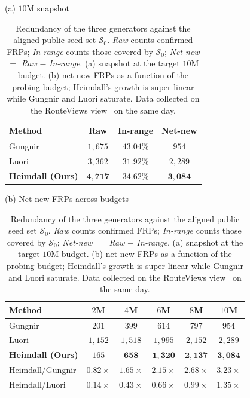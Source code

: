 \documentclass[conference]{IEEEtran}
\begin{document}
\begin{table}[t]
\centering
\caption{Redundancy of the three generators against the aligned
public seed set $\mathcal{S}_{0}$.  \emph{Raw} counts confirmed
FRPs; \emph{In-range} counts those covered by $\mathcal{S}_{0}$;
\emph{Net-new} $=$ \emph{Raw} $-$ \emph{In-range}.  (a) snapshot
at the target $10$M budget.  (b) net-new FRPs as a function of
the probing budget; Heimdall's growth is super-linear while Gungnir
and Luori saturate.  Data collected on the RouteViews
view~\cite{routeviews} on the same day.}
\label{tab:redundancy}
\vspace{2pt}
\small
\begin{minipage}{0.44\linewidth}
\centering
(a) $10$M snapshot\\[2pt]
\begin{tabular}{lccc}
\toprule
Method & Raw & In-range & \textbf{Net-new}\\
\midrule
Gungnir~\cite{wei2025gungnir} & $1{,}675$ & $43.04\%$ & $954$\\
Luori~\cite{cheng2024luori}   & $3{,}362$ & $31.92\%$ & $2{,}289$\\
\textbf{Heimdall (Ours)}          & $\mathbf{4{,}717}$ & $\mathbf{34.62\%}$ & $\mathbf{3{,}084}$\\
\bottomrule
\end{tabular}
\end{minipage}
\hfill
\begin{minipage}{0.54\linewidth}
\centering
(b) Net-new FRPs across budgets\\[2pt]
\begin{tabular}{lccccc}
\toprule
Method & $2$M & $4$M & $6$M & $8$M & $10$M\\
\midrule
Gungnir & $201$ & $399$ & $614$ & $797$ & $954$\\
Luori   & $1{,}152$ & $1{,}518$ & $1{,}995$ & $2{,}152$ & $2{,}289$\\
\textbf{Heimdall (Ours)} & $165$ & $\mathbf{658}$ & $\mathbf{1{,}320}$ & $\mathbf{2{,}137}$ & $\mathbf{3{,}084}$\\
\midrule
Heimdall/Gungnir & $0.82\!\times$ & $1.65\!\times$ & $2.15\!\times$ & $2.68\!\times$ & $\mathbf{3.23\!\times}$\\
Heimdall/Luori   & $0.14\!\times$ & $0.43\!\times$ & $0.66\!\times$ & $0.99\!\times$ & $\mathbf{1.35\!\times}$\\
\bottomrule
\end{tabular}
\end{minipage}
\end{table}
\end{document}
